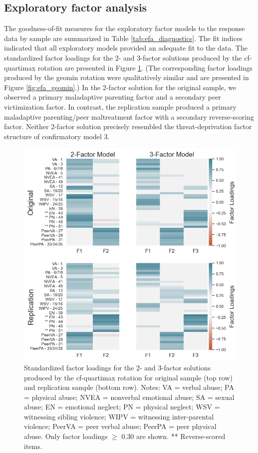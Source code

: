 \documentclass[letterpaper,man,natbib,floatsintext,longtable]{apa6}
\begin{document}
\subsection{Exploratory factor analysis}

The goodness-of-fit measures for the exploratory factor models to the response data by sample are summarized in Table \ref{tab:efa_diagnostics}. The fit indices indicated that all exploratory models provided an adequate fit to the data. The standardized factor loadings for the 2- and 3-factor solutions produced by the cf-quartimax rotation are presented in Figure \ref{fig:efa_cf}. (The corresponding factor loadings produced by the geomin rotation were qualitatively similar and are presented in Figure \ref{fig:efa_geomin}.) In the 2-factor solution for the original sample, we observed a primary maladaptive parenting factor and a secondary peer victimization factor. In contrast, the replication sample produced a primary maladaptive parenting/peer maltreatment factor with a secondary reverse-scoring factor. Neither 2-factor solution precisely resembled the threat-deprivation factor structure of confirmatory model 3.

\begin{figure}[t!]
    \centering
    \includegraphics[width=1\textwidth,center]{figures/fig04.png}
    \caption{\normalfont Standardized factor loadings for the 2- and 3-factor solutions produced by the cf-quartimax rotation for original sample (top row) and replication sample (bottom row). Notes: VA = verbal abuse; PA = physical abuse; NVEA = nonverbal emotional abuse; SA = sexual abuse; EN = emotional neglect; PN = physical neglect; WSV = witnessing sibling violence; WIPV = witnessing inter-parental violence; PeerVA = peer verbal abuse; PeerPA = peer physical abuse. Only factor loadings $\geq$ 0.30 are shown. ** Reverse-scored items.}
    \label{fig:efa_cf}
\end{figure}
\end{document}
